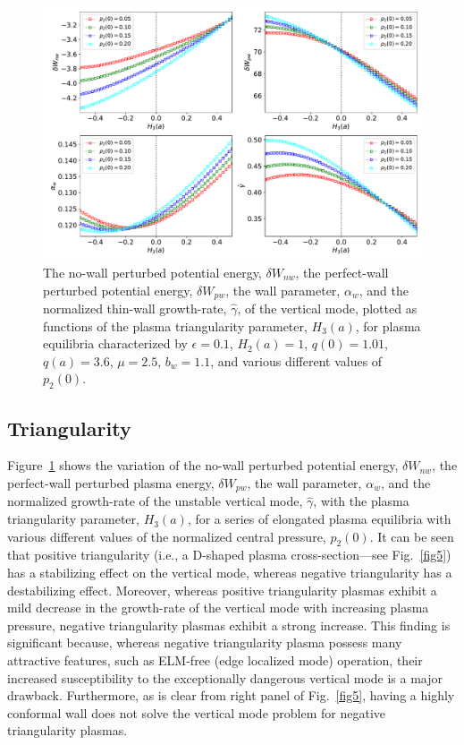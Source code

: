 \documentclass[12pt,prb,aps]{revtex4-1}
\begin{document}
\begin{figure}
\centerline{\includegraphics[width=\textwidth]{Fig4.pdf}}
\caption{The no-wall perturbed potential energy, $\delta W_{nw}$, the perfect-wall perturbed potential energy, $\delta W_{pw}$, the wall
parameter, $\alpha_w$, and the normalized thin-wall growth-rate, $\hat{\gamma}$,  of the  vertical  mode, plotted as  functions of the
plasma triangularity parameter, $H_3(a)$, for plasma equilibria characterized by  $\epsilon=0.1$, $H_2(a)=1$, $q(0)=1.01$, $q(a)=3.6$,  $\mu=2.5$, $b_w=1.1$, and
various different values of $p_2(0)$.  \label{fig4}}
\end{figure}

\subsection{Triangularity}
Figure~\ref{fig4} shows the variation of the no-wall perturbed potential energy, $\delta W_{nw}$, the perfect-wall perturbed plasma energy, $\delta W_{pw}$, the wall 
parameter, $\alpha_w$, and the normalized growth-rate of the unstable vertical mode, $\hat{\gamma}$, with the plasma triangularity parameter, $H_3(a)$,  for a series of
elongated plasma equilibria with various different values of the normalized central pressure, $p_2(0)$. It can be seen that
positive triangularity (i.e., a D-shaped plasma cross-section---see Fig.~\ref{fig5}) has a stabilizing effect on the vertical mode, whereas negative triangularity has
a destabilizing effect. Moreover, whereas positive triangularity plasmas exhibit a mild decrease in the growth-rate of the vertical mode with increasing plasma
pressure, negative triangularity plasmas exhibit a strong increase.\cite{guz} This finding is significant because, whereas negative triangularity plasma possess many attractive features,
such as ELM-free (edge localized mode) operation,\cite{guz} their increased susceptibility to the exceptionally dangerous vertical  mode is a major drawback. 
Furthermore, as is clear from right panel of Fig.~\ref{fig5}, having a highly conformal wall does not solve the vertical mode problem for negative triangularity plasmas. 
\end{document}
